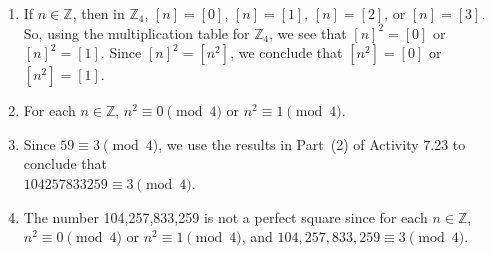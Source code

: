 \documentclass[11pt]{article}
\begin{document}
\begin{enumerate}
\item If  $n \in \mathbb{Z}$, then in  $\mathbb{Z}_4 $, $\left[ n \right] = \left[ 0 \right]$,
$\left[ n \right] = \left[ 1 \right]$, $\left[ n \right] = \left[ 2 \right]$, or 
$\left[ n \right] = \left[ 3 \right]$.  So, using the multiplication table for  $\mathbb{Z}_4 $, we see that  $\left[ n \right]^2  = \left[ 0 \right]$  or  
$\left[ n \right]^2  = \left[ 1 \right]$.  Since  $\left[ n \right]^2  = \left[ {n^2 } \right]$, we conclude that  $\left[ {n^2 } \right] = \left[ 0 \right]$  or  
$\left[ {n^2 } \right] = \left[ 1 \right]$.

\item For each  $n \in \mathbb{Z}$,  $n^2  \equiv 0 \pmod 4$  or  $n^2  \equiv 1 \pmod 4$.

\item Since  $59 \equiv 3 \pmod 4$, we use the results in Part~(2) of Activity 7.23 to conclude that  \\
$104 257 833 259 \equiv 3 \pmod 4$.

\item The number  104,257,833,259 is not a perfect square since for each  $n \in \mathbb{Z}$,  
$n^2  \equiv 0 \pmod 4$  or  $n^2  \equiv 1 \pmod 4$, and  
$104,257,833,259 \equiv 3 \pmod 4$.
\end{enumerate}
\end{document}
